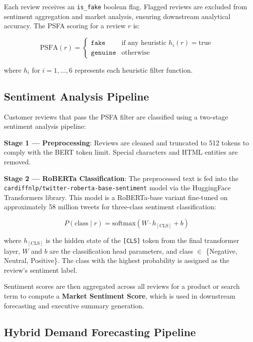 \documentclass[conference]{IEEEtran}
\begin{document}
Each review receives an \texttt{is\_fake} boolean flag. Flagged reviews are excluded from sentiment aggregation and market analysis, ensuring downstream analytical accuracy. The PSFA scoring for a review $r$ is:

\begin{equation}
\text{PSFA}(r) = \begin{cases} 
\texttt{fake} & \text{if any heuristic } h_i(r) = \text{true} \\
\texttt{genuine} & \text{otherwise}
\end{cases}
\label{eq:psfa}
\end{equation}

where $h_i$ for $i = 1, \ldots, 6$ represents each heuristic filter function.

\subsection{Sentiment Analysis Pipeline}

Customer reviews that pass the PSFA filter are classified using a two-stage sentiment analysis pipeline:

\textbf{Stage 1 --- Preprocessing}: Reviews are cleaned and truncated to 512 tokens to comply with the BERT token limit. Special characters and HTML entities are removed.

\textbf{Stage 2 --- RoBERTa Classification}: The preprocessed text is fed into the \texttt{cardiffnlp/twitter-roberta-base-sentiment} model via the HuggingFace Transformers library. This model is a RoBERTa-base variant fine-tuned on approximately 58 million tweets for three-class sentiment classification:

\begin{equation}
P(\text{class} \mid r) = \text{softmax}(W \cdot h_{[\text{CLS}]} + b)
\label{eq:roberta}
\end{equation}

where $h_{[\text{CLS}]}$ is the hidden state of the \texttt{[CLS]} token from the final transformer layer, $W$ and $b$ are the classification head parameters, and class $\in$ \{Negative, Neutral, Positive\}. The class with the highest probability is assigned as the review's sentiment label.

Sentiment scores are then aggregated across all reviews for a product or search term to compute a \textbf{Market Sentiment Score}, which is used in downstream forecasting and executive summary generation.

\subsection{Hybrid Demand Forecasting Pipeline}
\end{document}
